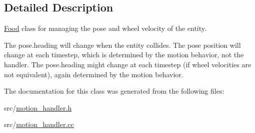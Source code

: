 \subsection{Detailed Description}
\mbox{\hyperlink{class_food}{Food}} class for managing the pose and wheel velocity of the entity. 

The pose.\+heading will change when the entity collides. The pose position will change at each timestep, which is determined by the motion behavior, not the handler. The pose.\+heading might change at each timestep (if wheel velocities are not equivalent), again determined by the motion behavior. 

The documentation for this class was generated from the following files\+:\begin{DoxyCompactItemize}
\item 
src/\mbox{\hyperlink{motion__handler_8h}{motion\+\_\+handler.\+h}}\item 
src/\mbox{\hyperlink{motion__handler_8cc}{motion\+\_\+handler.\+cc}}\end{DoxyCompactItemize}
